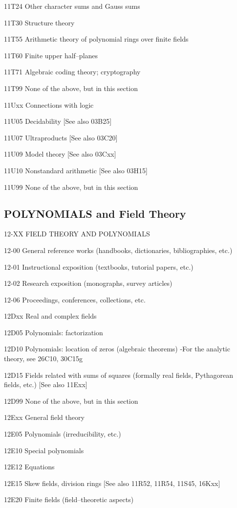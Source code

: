 \documentclass[12pt]{article}
\theoremstyle{plain}
\theoremstyle{definition}
\numberwithin{equation}{section}
\begin{document}
{11T24 Other character sums and Gauss sums

11T30 Structure theory

11T55 Arithmetic theory of polynomial rings over finite fields

11T60 Finite upper half--planes

11T71 Algebraic coding theory; cryptography

11T99 None of the above, but in this section

11Uxx Connections with logic

11U05 Decidability [See also 03B25]

11U07 Ultraproducts [See also 03C20]

11U09 Model theory [See also 03Cxx]

11U10 Nonstandard arithmetic [See also 03H15]

11U99 None of the above, but in this section


\subsection{POLYNOMIALS and Field Theory}
12-XX FIELD THEORY AND POLYNOMIALS

12-00 General reference works (handbooks, dictionaries, bibliographies, etc.)

12-01 Instructional exposition (textbooks, tutorial papers, etc.)

12-02 Research exposition (monographs, survey articles)

12-06 Proceedings, conferences, collections, etc.

12Dxx Real and complex fields

12D05 Polynomials: factorization

12D10 Polynomials: location of zeros (algebraic theorems) -For the analytic
theory, see 26C10, 30C15g

12D15 Fields related with sums of squares (formally real fields, Pythagorean fields, etc.) [See also 11Exx]

12D99 None of the above, but in this section

12Exx General field theory

12E05 Polynomials (irreducibility, etc.)

12E10 Special polynomials

12E12 Equations

12E15 Skew fields, division rings [See also 11R52, 11R54, 11S45, 16Kxx]

12E20 Finite fields (field--theoretic aspects)

}
\end{document}
